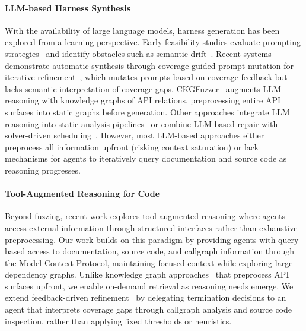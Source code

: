 \paragraph{LLM-based Harness Synthesis}
With the availability of large language models, harness generation has been explored from a learning perspective. Early feasibility studies evaluate prompting strategies~\cite{DBLP:conf/issta/ZhangZBLMXLSL24:HowEffectiveAreThey} and identify obstacles such as semantic drift~\cite{DBLP:conf/sigsoft:Jiang0MCZSWFWLZ24:WhenFuzzingMeetsLLMs}. Recent systems demonstrate automatic synthesis through coverage-guided prompt mutation for iterative refinement~\cite{DBLP:conf/ccs/LyuXCC24:PromptFuzz}, which mutates prompts based on coverage feedback but lacks semantic interpretation of coverage gaps. CKGFuzzer~\cite{DBLP:conf/icse/XuMZZCHLW25:CKGFuzzer} augments LLM reasoning with knowledge graphs of API relations, preprocessing entire API surfaces into static graphs before generation. Other approaches integrate LLM reasoning into static analysis pipelines~\cite{DBLP:journals/corr/abs-2505-03425:HGFuzzer} or combine LLM-based repair with solver-driven scheduling~\cite{DBLP:journals/corr/abs-2507-18289:Scheduzz}. However, most LLM-based approaches either preprocess all information upfront (risking context saturation) or lack mechanisms for agents to iteratively query documentation and source code as reasoning progresses.

\paragraph{Tool-Augmented Reasoning for Code}
Beyond fuzzing, recent work explores tool-augmented reasoning where agents access external information through structured interfaces rather than exhaustive preprocessing. Our work builds on this paradigm by providing agents with query-based access to documentation, source code, and callgraph information through the Model Context Protocol, maintaining focused context while exploring large dependency graphs. Unlike knowledge graph approaches~\cite{DBLP:conf/icse/XuMZZCHLW25:CKGFuzzer} that preprocess API surfaces upfront, we enable on-demand retrieval as reasoning needs emerge. We extend feedback-driven refinement~\cite{DBLP:conf/ccs/LyuXCC24:PromptFuzz, DBLP:conf/uss:ZhangLZZZZXLL0H23:Rubick} by delegating termination decisions to an agent that interprets coverage gaps through callgraph analysis and source code inspection, rather than applying fixed thresholds or heuristics.